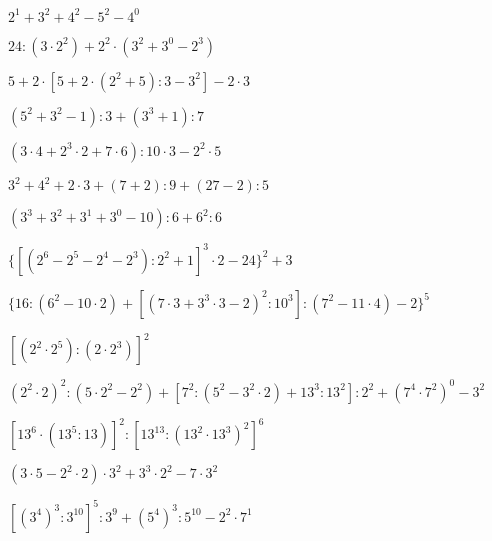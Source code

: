 \begin{esercizio} %
\(2^1+3^2+4^2-5^2-4^0\) 
\end{esercizio}
\begin{esercizio} %
\(24:(3\cdot2^2)+2^2\cdot(3^2+3^0-2^3)\) 
\end{esercizio}
\begin{esercizio} %
\(5+2\cdot[5+2\cdot(2^2+5):3-3^2]-2\cdot3\) 
\end{esercizio}
\begin{esercizio} %
\((5^2+3^2-1):3+(3^3+1):7\) 
\end{esercizio}
\begin{esercizio} %
\((3\cdot4+2^3\cdot2+7\cdot6):10\cdot3-2^2\cdot5\) 
\end{esercizio}
\begin{esercizio} %
\(3^2+4^2+2\cdot3+(7+2):9+(27-2):5\) 
\end{esercizio}
\begin{esercizio} %
\((3^3+3^2+3^1+3^0-10):6+6^2:6\) 
\end{esercizio}
\begin{esercizio} %
\(\{[(2^6-2^5-2^4-2^3):2^2+1]^3\cdot2-24\}^2+3\) 
\end{esercizio}
\begin{esercizio} %
\(\{16:(6^2-10\cdot2)+[(7\cdot3+3^3\cdot3-2)^2:10^3]:(7^2-11\cdot4)-2\}^5\)
\end{esercizio}
\begin{esercizio} %
\([(2^2\cdot2^5):(2\cdot2^3)]^2\) 
\end{esercizio}
\begin{esercizio} %
\((2^2\cdot2)^2:(5\cdot2^2-2^2)+[7^2:(5^2-3^2\cdot2)+13^3:13^2]:2^2+(7^4\cdot7
^2)^0-3^2\) 
\end{esercizio}
\begin{esercizio} %
\([13^6\cdot(13^5:13)]^2:[13^{13}:(13^2\cdot13^3)^2]^6\) 
\end{esercizio}
\begin{esercizio} %
\((3\cdot5-2^2\cdot2)\cdot3^2+3^3\cdot2^2-7\cdot3^2\) 
\end{esercizio}
\begin{esercizio} %
\([(3^4)^3:3^{10}]^5:3^9+(5^4)^3:5^{10}-2^2\cdot7^1\) 
\end{esercizio}
